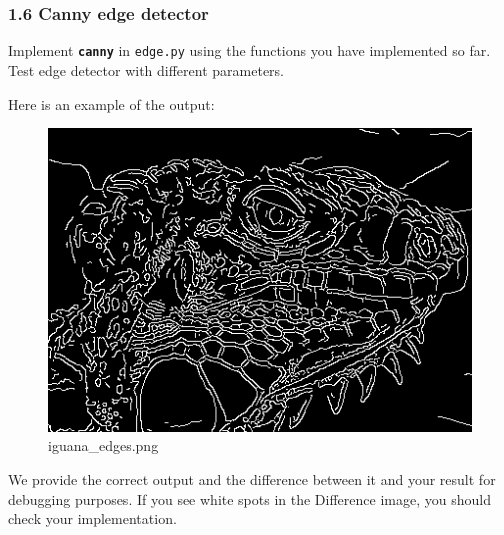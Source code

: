 \documentclass[11pt]{article}
\makeatletter
\def\maxwidth{\ifdim\Gin@nat@width>\linewidth\linewidth
    \else\Gin@nat@width\fi}
\let\Oldincludegraphics\includegraphics
\renewcommand{\includegraphics}[1]{\Oldincludegraphics[width=.8\maxwidth]{#1}}
\makeatother
\begin{document}
    \begin{center}
    \end{center}
    { \hspace*{\fill} \\}
    
    \begin{center}
    \end{center}
    { \hspace*{\fill} \\}
    
    \hypertarget{canny-edge-detector}{%
\subsubsection{1.6 Canny edge detector}\label{canny-edge-detector}}

Implement \textbf{\texttt{canny}} in \texttt{edge.py} using the
functions you have implemented so far. Test edge detector with different
parameters.

Here is an example of the output:

\begin{figure}
\centering
\includegraphics{iguana_edges.png}
\caption{iguana\_edges.png}
\end{figure}

We provide the correct output and the difference between it and your
result for debugging purposes. If you see white spots in the Difference
image, you should check your implementation.
\end{document}
